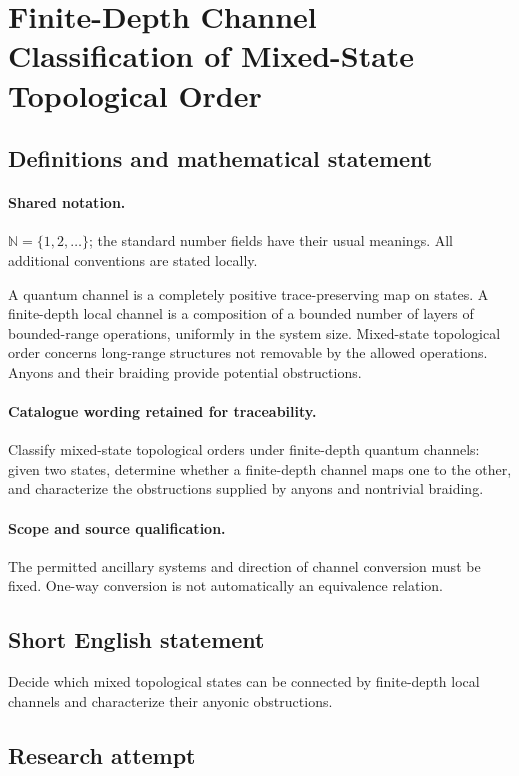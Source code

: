 \documentclass[11pt]{article}
\begin{document}
\section{Finite-Depth Channel Classification of Mixed-State Topological Order}\label{statement}

\subsection{Definitions and mathematical statement}

\paragraph{Shared notation.}$\mathbb N=\{1,2,\ldots\}$; the standard number fields have their usual meanings. All additional conventions are stated locally.


A quantum channel is a completely positive trace-preserving map on states. A finite-depth local channel is a composition of a bounded number of layers of bounded-range operations, uniformly in the system size. Mixed-state topological order concerns long-range structures not removable by the allowed operations. Anyons and their braiding provide potential obstructions.

\paragraph{Catalogue wording retained for traceability.}
Classify mixed-state topological orders under finite-depth quantum channels: given two states, determine whether a finite-depth channel maps one to the other, and characterize the obstructions supplied by anyons and nontrivial braiding.

\paragraph{Scope and source qualification.}The permitted ancillary systems and direction of channel conversion must be fixed. One-way conversion is not automatically an equivalence relation.
\subsection{Short English statement}
Decide which mixed topological states can be connected by finite-depth local channels and characterize their anyonic obstructions.
\subsection{Research attempt}
\end{document}
